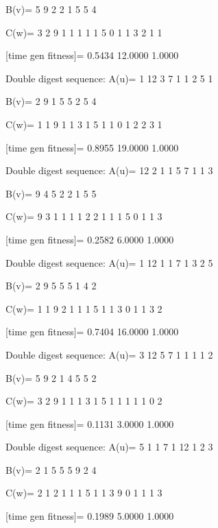 B(v)=
     5     9     2     2     1     5     5     4

C(w)=
     3     2     9     1     1     1     1     1     5     0     1     1     3     2     1     1

[time gen fitness]=
    0.5434   12.0000    1.0000

Double digest sequence:
A(u)=
     1    12     3     7     1     1     2     5     1

B(v)=
     2     9     1     5     5     2     5     4

C(w)=
     1     1     9     1     1     3     1     5     1     1     0     1     2     2     3     1

[time gen fitness]=
    0.8955   19.0000    1.0000

Double digest sequence:
A(u)=
    12     2     1     1     5     7     1     1     3

B(v)=
     9     4     5     2     2     1     5     5

C(w)=
     9     3     1     1     1     1     2     2     1     1     1     5     0     1     1     3

[time gen fitness]=
    0.2582    6.0000    1.0000

Double digest sequence:
A(u)=
     1    12     1     1     7     1     3     2     5

B(v)=
     2     9     5     5     5     1     4     2

C(w)=
     1     1     9     2     1     1     1     5     1     1     3     0     1     1     3     2

[time gen fitness]=
    0.7404   16.0000    1.0000

Double digest sequence:
A(u)=
     3    12     5     7     1     1     1     1     2

B(v)=
     5     9     2     1     4     5     5     2

C(w)=
     3     2     9     1     1     1     3     1     5     1     1     1     1     1     0     2

[time gen fitness]=
    0.1131    3.0000    1.0000

Double digest sequence:
A(u)=
     5     1     1     7     1    12     1     2     3

B(v)=
     2     1     5     5     5     9     2     4

C(w)=
     2     1     2     1     1     1     5     1     1     3     9     0     1     1     1     3

[time gen fitness]=
    0.1989    5.0000    1.0000

